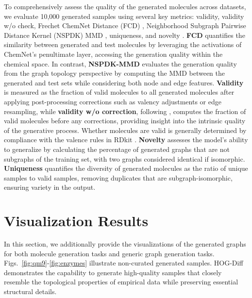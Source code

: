 To comprehensively assess the quality of the generated molecules across datasets, we evaluate 10,000 generated samples using several key metrics: validity, validity w/o check, Frechet ChemNet Distance (FCD) \cite{FCD}, Neighborhood Subgraph Pairwise Distance Kernel (NSPDK) MMD \cite{NSPKD-MMD}, uniqueness, and novelty \cite{GDSS+ICML2022}.
\textbf{FCD} quantifies the similarity between generated and test molecules by leveraging the activations of ChemNet's penultimate layer, accessing the generation quality within the chemical space.
In contrast, \textbf{NSPDK-MMD} evaluates the generation quality from the graph topology perspective by computing the MMD between the generated and test sets while considering both node and edge features.
\textbf{Validity} is measured as the fraction of valid molecules to all generated molecules after applying post-processing corrections such as valency adjustments or edge resampling, while \textbf{validity w/o correction}, following \citet{GDSS+ICML2022}, computes the fraction of valid molecules before any corrections, providing insight into the intrinsic quality of the generative process. 
Whether molecules are valid is generally determined by compliance with the valence rules in RDkit \cite{Rdkit2016}.
\textbf{Novelty} assesses the model’s ability to generalize by calculating the percentage of generated graphs that are not subgraphs of the training set, with two graphs considered identical if isomorphic.
\textbf{Uniqueness} quantifies the diversity of generated molecules as the ratio of unique samples to valid samples, removing duplicates that are subgraph-isomorphic, ensuring variety in the output.





\section{Visualization Results}
\label{app:vis}

In this section, we additionally provide the visualizations of the generated graphs for both molecule generation tasks and generic graph generation tasks.
Figs.~\ref{fig:qm9}-\ref{fig:enzymes} illustrate non-curated generated samples. HOG-Diff demonstrates the capability to generate high-quality samples that closely resemble the topological properties of empirical data while preserving essential structural details.

